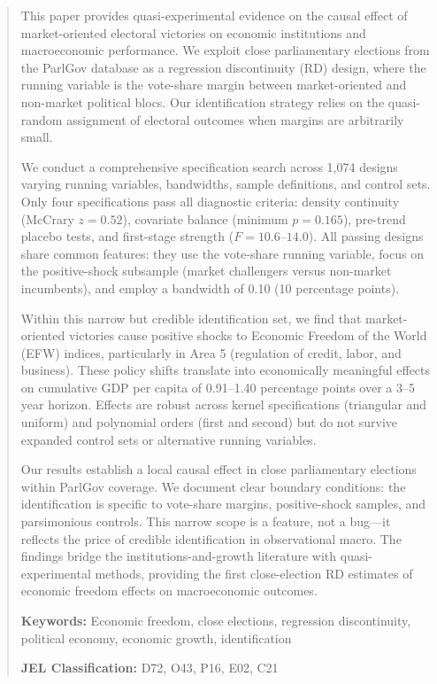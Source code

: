 \documentclass[12pt,a4paper]{article}
\begin{document}
\begin{abstract}
\noindent
This paper provides quasi-experimental evidence on the causal effect of 
market-oriented electoral victories on economic institutions and macroeconomic 
performance. We exploit close parliamentary elections from the ParlGov database 
as a regression discontinuity (RD) design, where the running variable is the 
vote-share margin between market-oriented and non-market political blocs. 
Our identification strategy relies on the quasi-random assignment of electoral 
outcomes when margins are arbitrarily small.

We conduct a comprehensive specification search across 1,074 designs varying 
running variables, bandwidths, sample definitions, and control sets. Only four 
specifications pass all diagnostic criteria: density continuity (McCrary $z = 0.52$), 
covariate balance (minimum $p = 0.165$), pre-trend placebo tests, and first-stage 
strength ($F = 10.6$--$14.0$). All passing designs share common features: they use 
the vote-share running variable, focus on the positive-shock subsample (market 
challengers versus non-market incumbents), and employ a bandwidth of 0.10 
(10 percentage points).

Within this narrow but credible identification set, we find that market-oriented 
victories cause positive shocks to Economic Freedom of the World (EFW) indices, 
particularly in Area 5 (regulation of credit, labor, and business). These 
policy shifts translate into economically meaningful effects on cumulative GDP 
per capita of 0.91--1.40 percentage points over a 3--5 year horizon. Effects are 
robust across kernel specifications (triangular and uniform) and polynomial 
orders (first and second) but do not survive expanded control sets or alternative 
running variables.

Our results establish a local causal effect in close parliamentary elections 
within ParlGov coverage. We document clear boundary conditions: the identification 
is specific to vote-share margins, positive-shock samples, and parsimonious 
controls. This narrow scope is a feature, not a bug---it reflects the price of 
credible identification in observational macro. The findings bridge the 
institutions-and-growth literature with quasi-experimental methods, providing 
the first close-election RD estimates of economic freedom effects on 
macroeconomic outcomes.

\bigskip
\noindent
\textbf{Keywords:} Economic freedom, close elections, regression discontinuity, 
political economy, economic growth, identification

\bigskip
\noindent
\textbf{JEL Classification:} D72, O43, P16, E02, C21
\end{abstract}
\end{document}

